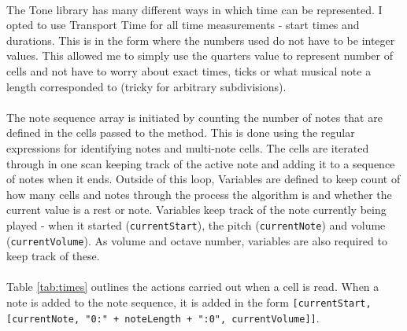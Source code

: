 \paragraph{} The Tone library has many different ways in which time can be represented. I opted to use Transport Time for all time measurements - start times and durations. This is in the form \texttt{} where the numbers used do not have to be integer values. This allowed me to simply use the quarters value to represent number of cells and not have to worry about exact times, ticks or what musical note a length corresponded to (tricky for arbitrary subdivisions).

\paragraph{} The note sequence array is initiated by counting the number of notes that are defined in the cells passed to the method. This is done using the regular expressions for identifying notes and multi-note cells. The cells are iterated through in one scan keeping track of the active note and adding it to a sequence of notes when it ends. Outside of this loop, Variables are defined to keep count of how many cells and notes through the process the algorithm is and whether the current value is a rest or note. Variables keep track of the note currently being played - when it started (\texttt{currentStart}), the pitch (\texttt{currentNote}) and volume (\texttt{currentVolume}). As volume and octave number, variables are also required to keep track of these.

\paragraph{} Table \ref{tab:times} outlines the actions carried out when a cell is read. When a note is added to the note sequence, it is added in the form \texttt{[currentStart, [currentNote, "0:" + noteLength + ":0", currentVolume]]}.

